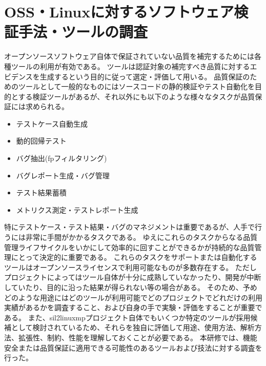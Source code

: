 \section{OSS・Linuxに対するソフトウェア検証手法・ツールの調査}
オープンソースソフトウェア自体で保証されていない品質を補完するためには各種ツールの利用が有効である。
ツールは認証対象の補完すべき品質に対するエビデンスを生成するという目的に従って選定・評価して用いる。
品質保証のためのツールとして一般的なものにはソースコードの静的検証やテスト自動化を目的とする検証ツールがあるが、それ以外にも以下のような様々なタスクが品質保証には求められる。
\begin{itemize}
  \item テストケース自動生成
  \item 動的回帰テスト
  \item バグ抽出(\acrshort{fp}フィルタリング)
  \item バグレポート生成・バグ管理
  \item テスト結果蓄積
  \item メトリクス測定・テストレポート生成
\end{itemize}
\par
特にテストケース・テスト結果・バグのマネジメントは重要であるが、人手で行うには非常に手間がかかるタスクである。
ゆえにこれらのタスクからなる品質管理ライフサイクルをいかにして効率的に回すことができるかが持続的な品質管理にとって決定的に重要である。
これらのタスクをサポートまたは自動化するツールはオープンソースライセンスで利用可能なものが多数存在する。
ただしプロジェクトによってはツール自体が十分に成熟していなかったり、開発が中断していたり、目的に沿った結果が得られない等の場合がある。
そのため、予めどのような用途にはどのツールが利用可能でどのプロジェクトでどれだけの利用実績があるかを調査すること、および自身の手で実験・評価をすることが重要である。
また、\acrshort{sil2linuxmp}プロジェクト自体でもいくつか特定のツールが採用候補として検討されているため、それらを独自に評価して用途、使用方法、解析方法、拡張性、制約、性能を理解しておくことが必要である。
本研修では、機能安全または品質保証に適用できる可能性のあるツールおよび技法に対する調査を行った。


